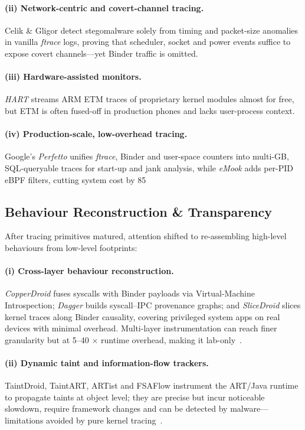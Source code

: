 \documentclass[a4paper,12pt]{report}
\begin{document}
\paragraph{(ii) Network-centric and covert-channel tracing.}
Celik \& Gligor detect stegomalware solely from timing and packet-size anomalies in vanilla \textit{ftrace} logs, proving that scheduler, socket and power events suffice to expose covert channels—yet Binder traffic is omitted.

\paragraph{(iii) Hardware-assisted monitors.}
\emph{HART} streams ARM ETM traces of proprietary kernel modules almost for free, but ETM is often fused-off in production phones and lacks user-process context.

\paragraph{(iv) Production-scale, low-overhead tracing.}
Google’s \emph{Perfetto} unifies \textit{ftrace}, Binder and user-space counters into multi-GB, SQL-queryable traces for start-up and jank analysis, while \emph{eMook} adds per-PID eBPF filters, cutting system cost by 85 %

\subsection{Behaviour Reconstruction \& Transparency}
After tracing primitives matured, attention shifted to re-assembling high-level behaviours from low-level footprints:

\paragraph{(i) Cross-layer behaviour reconstruction.}
\emph{CopperDroid} fuses syscalls with Binder payloads via Virtual-Machine Introspection; \emph{Dagger} builds syscall–IPC provenance graphs; and \emph{SliceDroid} slices kernel traces along Binder causality, covering privileged system apps on real devices with minimal overhead. Multi-layer instrumentation can reach finer granularity but at 5–40 × runtime overhead, making it lab-only~\cite{placeholder_citation_1}.

\paragraph{(ii) Dynamic taint and information-flow trackers.}
TaintDroid, TaintART, ARTist and FSAFlow instrument the ART/Java runtime to propagate taints at object level; they are precise but incur noticeable slowdown, require framework changes and can be detected by malware—limitations avoided by pure kernel tracing~\cite{placeholder_citation_2}.
\end{document}
